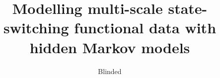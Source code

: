 \documentclass[12pt]{TD-CJS}
\begin{document}

\renewcommand{\eqref}[1]{(\ref{#1})}
\newcommand{\mb}[1]{\mathbf{#1}}
\newcommand{\mbb}[1]{\mathbb{#1}}
\newcommand{\mt}[1]{\mathrm{#1}}
\newcommand{\rv}{random variable}
\newcommand{\newblock}{}


\title[]{Modelling multi-scale state-switching functional data with hidden Markov models}
\author{Blinded}%
\end{document}
